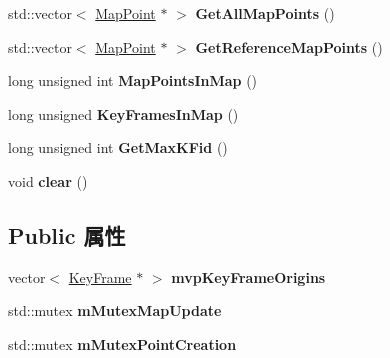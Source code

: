 \begin{DoxyCompactItemize}
\item 
\hypertarget{classORB__SLAM2_1_1Map_a09f346e647d3d36ec644f96d878b0c9b}{std\-::vector$<$ \hyperlink{classORB__SLAM2_1_1MapPoint}{Map\-Point} $\ast$ $>$ {\bfseries Get\-All\-Map\-Points} ()}\label{classORB__SLAM2_1_1Map_a09f346e647d3d36ec644f96d878b0c9b}

\item 
\hypertarget{classORB__SLAM2_1_1Map_a56e1d96a4e1d669609e2c2a493f133c2}{std\-::vector$<$ \hyperlink{classORB__SLAM2_1_1MapPoint}{Map\-Point} $\ast$ $>$ {\bfseries Get\-Reference\-Map\-Points} ()}\label{classORB__SLAM2_1_1Map_a56e1d96a4e1d669609e2c2a493f133c2}

\item 
\hypertarget{classORB__SLAM2_1_1Map_ad2d7846734c8cb0421d67ff3907649ad}{long unsigned int {\bfseries Map\-Points\-In\-Map} ()}\label{classORB__SLAM2_1_1Map_ad2d7846734c8cb0421d67ff3907649ad}

\item 
\hypertarget{classORB__SLAM2_1_1Map_a3440f5e9e93ca7231bde3c5138ab5f5c}{long unsigned {\bfseries Key\-Frames\-In\-Map} ()}\label{classORB__SLAM2_1_1Map_a3440f5e9e93ca7231bde3c5138ab5f5c}

\item 
\hypertarget{classORB__SLAM2_1_1Map_a1c93202df313c1245056e01dbb070dca}{long unsigned int {\bfseries Get\-Max\-K\-Fid} ()}\label{classORB__SLAM2_1_1Map_a1c93202df313c1245056e01dbb070dca}

\item 
\hypertarget{classORB__SLAM2_1_1Map_abf0d75e6e234d89b06f568c4600d0436}{void {\bfseries clear} ()}\label{classORB__SLAM2_1_1Map_abf0d75e6e234d89b06f568c4600d0436}

\end{DoxyCompactItemize}
\subsection*{Public 属性}
\begin{DoxyCompactItemize}
\item 
\hypertarget{classORB__SLAM2_1_1Map_a9617fdf1c8349a1bf88bb13c20acf160}{vector$<$ \hyperlink{classORB__SLAM2_1_1KeyFrame}{Key\-Frame} $\ast$ $>$ {\bfseries mvp\-Key\-Frame\-Origins}}\label{classORB__SLAM2_1_1Map_a9617fdf1c8349a1bf88bb13c20acf160}

\item 
\hypertarget{classORB__SLAM2_1_1Map_a05544c09b3227d31163f10609b90b913}{std\-::mutex {\bfseries m\-Mutex\-Map\-Update}}\label{classORB__SLAM2_1_1Map_a05544c09b3227d31163f10609b90b913}

\item 
\hypertarget{classORB__SLAM2_1_1Map_a968356226057387d8207054d56e5d35c}{std\-::mutex {\bfseries m\-Mutex\-Point\-Creation}}\label{classORB__SLAM2_1_1Map_a968356226057387d8207054d56e5d35c}

\end{DoxyCompactItemize}
